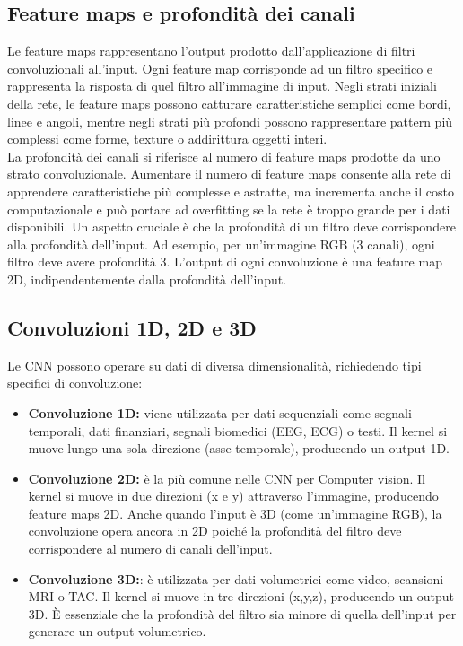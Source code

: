 \documentclass[a4paper,12pt]{report}
\begin{document}
	\subsection{Feature maps e profondità dei canali}
	Le feature maps rappresentano l'output prodotto dall'applicazione di filtri convoluzionali all'input. Ogni feature map corrisponde ad un filtro specifico e rappresenta la risposta di quel filtro all'immagine di input. Negli strati iniziali della rete, le feature maps possono catturare caratteristiche semplici come bordi, linee e angoli, mentre negli strati più profondi possono rappresentare pattern più complessi come forme, texture o addirittura oggetti interi. \\
	La profondità dei canali si riferisce al numero di feature maps prodotte da uno strato convoluzionale. Aumentare il numero di feature maps consente alla rete di apprendere caratteristiche più complesse e astratte, ma incrementa anche il costo computazionale e può portare ad overfitting se la rete è troppo grande per i dati disponibili. Un aspetto cruciale è che la profondità di un filtro deve corrispondere alla profondità dell'input. Ad esempio, per un'immagine RGB (3 canali), ogni filtro deve avere profondità 3. L'output di ogni convoluzione è una feature map 2D, indipendentemente dalla profondità dell'input.
	
	\subsection{Convoluzioni 1D, 2D e 3D}
	Le CNN possono operare su dati di diversa dimensionalità, richiedendo tipi specifici di convoluzione:
	\begin{itemize}
		\item \textbf{Convoluzione 1D:} viene utilizzata per dati sequenziali come segnali temporali, dati finanziari, segnali biomedici (EEG, ECG) o testi. Il kernel si muove lungo una sola direzione (asse temporale), producendo un output 1D.
		\item \textbf{Convoluzione 2D:} è la più comune nelle CNN per Computer vision. Il kernel si muove in due direzioni (x e y) attraverso l'immagine, producendo feature maps 2D. Anche quando l'input è 3D (come un'immagine RGB), la convoluzione opera ancora in 2D poiché la profondità del filtro deve corrispondere al numero di canali dell'input.
		\item \textbf{Convoluzione 3D:}: è utilizzata per dati volumetrici come video, scansioni MRI o TAC. Il kernel si muove in tre direzioni (x,y,z), producendo un output 3D. È essenziale che la profondità del filtro sia minore di quella dell'input per generare un output volumetrico.
	\end{itemize}
	
\end{document}
